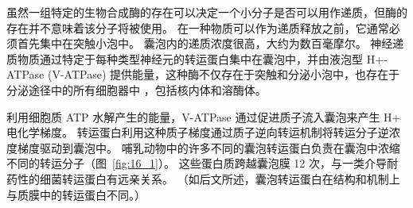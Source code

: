 虽然一组特定的生物合成酶的存在可以决定一个小分子是否可以用作递质，但酶的存在并不意味着该分子将被使用。
在一种物质可以作为递质释放之前，它通常必须首先集中在突触小泡中。
囊泡内的递质浓度很高，大约为数百毫摩尔。
神经递质物质通过特定于每种类型神经元的转运蛋白集中在囊泡中，并由液泡型 H+-ATPase (V-ATPase) 提供能量，这种酶不仅存在于突触和分泌小泡中，也存在于分泌途径中的所有细胞器中 ，包括核内体和溶酶体。


利用细胞质 ATP 水解产生的能量，V-ATPase 通过促进质子流入囊泡来产生 H+ 电化学梯度。
转运蛋白利用这种质子梯度通过质子逆向转运机制将转运分子逆浓度梯度驱动到囊泡中。
哺乳动物中的许多不同的囊泡转运蛋白负责在囊泡中浓缩不同的转运分子（图~\ref{fig:16_1}）。
这些蛋白质跨越囊泡膜 12 次，与一类介导耐药性的细菌转运蛋白有远亲关系。
（如后文所述，囊泡转运蛋白在结构和机制上与质膜中的转运蛋白不同。）


